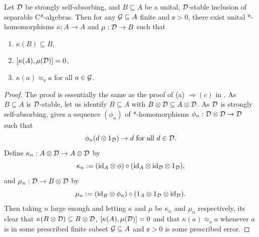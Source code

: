 \documentclass[12pt]{amsart}
\begin{document}
\begin{lemma}\label{lem:kappa-mu}
Let $\mathcal{D}$ be strongly self-absorbing, and $B \subseteq A$ be a unital, $\mathcal{D}$-stable inclusion of separable C*-algebras. Then for any $\mathcal{G} \subseteq A$ finite and $\ee > 0$, there exist unital *-homomorphisms $\kappa: A \to A$ and $\mu: \mathcal{D} \to B$ such that
\begin{enumerate}
\item $\kappa(B) \subseteq B$,
\item $[\kappa(A),\mu(\mathcal{D})] = 0$,
\item $\kappa(a) \approx_\ee a$ for all $a \in \mathcal{G}$.
\end{enumerate}
\begin{proof}
The proof is essentially the same as the proof of (a) $\Rightarrow (c)$ in \cite[Proposition 4.1]{HirshbergRordamWinter07}. As $B \subseteq A$ is $\mathcal{D}$-stable, let us identify $B \subseteq A$ with $B \otimes \mathcal{D} \subseteq A \otimes \mathcal{D}$. As $\mathcal{D}$ is strongly self-absorbing,  \cite[Theorem 2.3]{TomsWinter07} gives a sequence $(\phi_n)$ of *-homomorphisms $\phi_n: \mathcal{D} \otimes \mathcal{D} \to \mathcal{D}$ such that
\begin{equation}
\phi_n(d \otimes 1_{\mathcal{D}}) \to d \text{ for all } d \in \mathcal{D}.
\end{equation}
Define $\kappa_n: A \otimes \mathcal{D} \to A \otimes \mathcal{D}$ by
\begin{equation}
\kappa_n:= (\text{id}_A \otimes \phi) \circ (\text{id}_A \otimes \text{id}_{\mathcal{D}} \otimes 1_{\mathcal{D}}), 
\end{equation}
and $\mu_n: \mathcal{D} \to B \otimes \mathcal{D}$ by
\begin{equation}
\mu_n := (\text{id}_B \otimes \phi_n) \circ (1_A \otimes 1_{\mathcal{D}} \otimes \text{id}_{\mathcal{D}}).
\end{equation}
Then taking $n$ large enough and letting $\kappa$ and $\mu$ be $\kappa_n$ and $\mu_n$ respectively, its clear that $\kappa(B \otimes \mathcal{D}) \subseteq B \otimes \mathcal{D}$, $[\kappa(A),\mu(\mathcal{D})] = 0$ and that $\kappa(a) \approx_\ee a$ whenever $a$ is in some prescribed finite subset $\mathcal{G} \subseteq A$ and $\ee > 0$ is some prescribed error. 
\end{proof}
\end{lemma}
\end{document}
